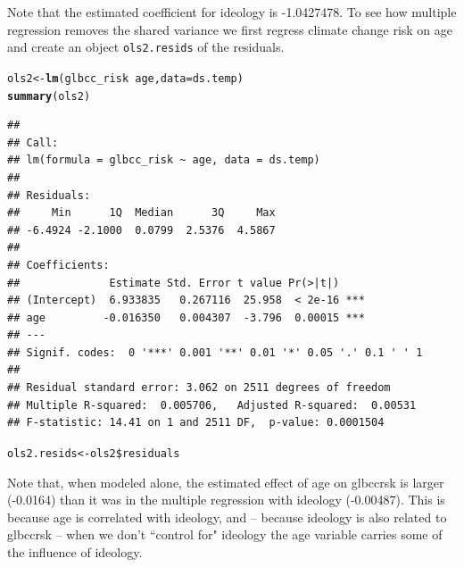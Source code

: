 \documentclass[11pt,openany]{book}\usepackage[]{graphicx}\usepackage[]{color}
\makeatletter
\newcommand{\hlopt}[1]{\textcolor[rgb]{0,0,0}{#1}}%
\newcommand{\hlstd}[1]{\textcolor[rgb]{0.345,0.345,0.345}{#1}}%
\newcommand{\hlkwb}[1]{\textcolor[rgb]{0.69,0.353,0.396}{#1}}%
\newcommand{\hlkwc}[1]{\textcolor[rgb]{0.333,0.667,0.333}{#1}}%
\newcommand{\hlkwd}[1]{\textcolor[rgb]{0.737,0.353,0.396}{\textbf{#1}}}%
\newenvironment{kframe}{%
 \def\at@end@of@kframe{}%
 \ifinner\ifhmode%
  \def\at@end@of@kframe{\end{minipage}}%
  \begin{minipage}{\columnwidth}%
 \fi\fi%
 \def\FrameCommand##1{\hskip\@totalleftmargin \hskip-\fboxsep
 \colorbox{shadecolor}{##1}\hskip-\fboxsep
     \hskip-\linewidth \hskip-\@totalleftmargin \hskip\columnwidth}%
 \MakeFramed {\advance\hsize-\width
   \@totalleftmargin\z@ \linewidth\hsize
   \@setminipage}}%
 {\par\unskip\endMakeFramed%
 \at@end@of@kframe}
\newenvironment{knitrout}{}{} %
\renewenvironment{knitrout}{\begin{singlespace}}{\end{singlespace}}
\makeatother
\begin{document}
\noindent Note that the estimated coefficient for ideology is -1.0427478. To see how multiple regression removes the shared variance we first regress climate change risk on age and create an object \texttt{ols2.resids} of the residuals. 
\begin{knitrout}
\color{fgcolor}\begin{kframe}
\begin{alltt}
\hlstd{ols2} \hlkwb{<-} \hlkwd{lm}\hlstd{(glbcc_risk} \hlopt{~} \hlstd{age,} \hlkwc{data} \hlstd{= ds.temp)}
\hlkwd{summary}\hlstd{(ols2)}
\end{alltt}
\begin{verbatim}
## 
## Call:
## lm(formula = glbcc_risk ~ age, data = ds.temp)
## 
## Residuals:
##     Min      1Q  Median      3Q     Max 
## -6.4924 -2.1000  0.0799  2.5376  4.5867 
## 
## Coefficients:
##              Estimate Std. Error t value Pr(>|t|)    
## (Intercept)  6.933835   0.267116  25.958  < 2e-16 ***
## age         -0.016350   0.004307  -3.796  0.00015 ***
## ---
## Signif. codes:  0 '***' 0.001 '**' 0.01 '*' 0.05 '.' 0.1 ' ' 1
## 
## Residual standard error: 3.062 on 2511 degrees of freedom
## Multiple R-squared:  0.005706,	Adjusted R-squared:  0.00531 
## F-statistic: 14.41 on 1 and 2511 DF,  p-value: 0.0001504
\end{verbatim}
\begin{alltt}
\hlstd{ols2.resids} \hlkwb{<-} \hlstd{ols2}\hlopt{\$}\hlstd{residuals}
\end{alltt}
\end{kframe}
\end{knitrout}

Note that, when modeled alone, the estimated effect of age on glbccrsk is larger (-0.0164) than it was in the multiple regression with ideology (-0.00487). This is because age is correlated with ideology, and -- because ideology is also related to glbccrsk -- when we don't ``control for" ideology the age variable carries some of the influence of ideology.
\end{document}
